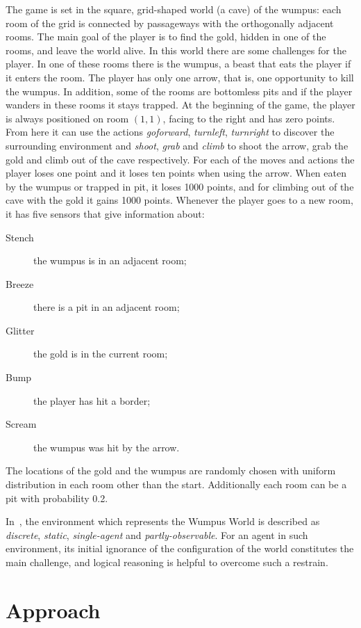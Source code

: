 \documentclass{llncs}
\begin{document}
The game is set in the square, grid-shaped world (a cave) of the wumpus: each room of the grid is connected by passageways with the orthogonally adjacent rooms.
The main goal of the player is to find the gold, hidden in one of the rooms, and leave the world alive.
In this world there are some challenges for the player.
In one of these rooms there is the wumpus, a beast that eats the player if it enters the room. The player has only one arrow, that is, one opportunity to kill the wumpus. In addition, some of the rooms are bottomless pits and if the player wanders in these rooms it stays trapped. At the beginning of the game, the player is always positioned on room $(1,1)$, facing to the right and has zero points. From here it can use the actions \emph{goforward}, \emph{turnleft}, \emph{turnright} to discover the surrounding environment and \emph{shoot}, \emph{grab} and \emph{climb} to shoot the arrow, grab the gold and climb out of the cave respectively. For each of the moves and actions the player loses one point and it loses ten points when using the arrow. When eaten by the wumpus or trapped in pit, it loses 1000 points, and for climbing out of the cave with the gold it gains 1000 points. Whenever the player goes to a new room, it has five sensors that give information about:
\begin{description}
	\item[Stench]{the wumpus is in an adjacent room;}
	\item[Breeze]{there is a pit in an adjacent room;}
	\item[Glitter]{the gold is in the current room;}
	\item[Bump]{the player has hit a border;}
	\item[Scream]{the wumpus was hit by the arrow.}
\end{description}
The locations of the gold and the wumpus are randomly chosen with uniform distribution in each room other than the start. Additionally each room can be a pit with probability 0.2.

In~\cite{book:aima}, the environment which represents the Wumpus World is described as \emph{discrete}, \emph{static}, \emph{single-agent} and \emph{partly-observable}. For an agent in such environment, its initial ignorance of the configuration of the world constitutes the main challenge, and logical reasoning is helpful to overcome such a restrain.

\section{Approach}
\end{document}
